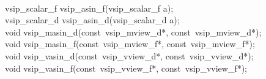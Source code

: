 \\\cvsiplh
\begin{cfuncs}
vsip\_scalar\_f vsip\_asin\_f(vsip\_scalar\_f a);\Bs\\
vsip\_scalar\_d vsip\_asin\_d(vsip\_scalar\_d a);\Bs\\
void vsip\_masin\_d(const~vsip\_mview\_d*, const~vsip\_mview\_d*);\Bs\\
void vsip\_masin\_f(const~vsip\_mview\_f*, const~vsip\_mview\_f*);\Bs\\
void vsip\_vasin\_d(const~vsip\_vview\_d*, const~vsip\_vview\_d*);\Bs\\
void vsip\_vasin\_f(const~vsip\_vview\_f*, const~vsip\_vview\_f*);\Bs\\
\end{cfuncs}
\pyjvsiph
{}
